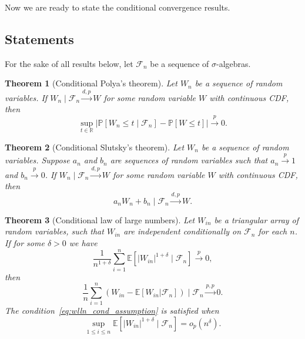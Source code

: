 \documentclass[aos]{imsart}
\theoremstyle{plain}
\newtheorem{theorem}{Theorem}
\theoremstyle{remark}
\newcommand{\E}{\mathbb E}								%
\renewcommand{\P}{\mathbb{P}}							%
\newcommand{\R}{\mathbb{R}}								%
\newcommand{\convp}{\overset p \rightarrow}             %
\newcommand{\convdp}{\overset {d,p} \longrightarrow}    %
\newcommand{\convpp}{\overset {p,p} \longrightarrow}    %
\begin{document}
\noindent Now we are ready to state the conditional convergence results. 

\subsection{Statements}

For the sake of all results below, let $\mathcal F_n$ be a sequence of $\sigma$-algebras.

\begin{theorem}[Conditional Polya's theorem]\label{thm:cond_polya} 
	Let $W_n$ be a sequence of random variables. If $W_n \mid \mathcal F_n \convdp W$ for some random variable $W$ with continuous CDF, then
	\begin{equation}
		\sup_{t \in \R}|\P[W_n \leq t \mid \mathcal F_n] - \P[W \leq t]| \convp 0.
	\end{equation}

\end{theorem}

\begin{theorem}[Conditional Slutsky's theorem]\label{thm:cond_slutsky}
	Let $W_n$ be a sequence of random variables. Suppose $a_n$ and $b_n$ are sequences of random variables such that $a_n \convp 1$ and $b_n \convp 0$. If $W_n \mid \mathcal F_n \convdp W$ for some random variable $W$ with continuous CDF, then
	\begin{equation}
		a_n W_n + b_n \mid \mathcal F_n \convdp W.
	\end{equation}
	
\end{theorem}

\begin{theorem}[Conditional law of large numbers]\label{thm:wlln_cond} 
	Let $W_{in}$ be a triangular array of random variables, such that $W_{in}$ are independent conditionally on $\mathcal F_n$ for each $n$. If for some $\delta > 0$ we have
	\begin{equation}
		\frac{1}{n^{1+\delta}}\sum_{i=1}^n\E[|W_{in}|^{1+\delta}\mid\mathcal{F}_n] \convp 0,
		\label{eq:wlln_cond_assumption}
	\end{equation}
	then 
	\begin{equation}
		\frac{1}{n} \sum_{i = 1}^n (W_{in} - \E[W_{in}|\mathcal{F}_n]) \mid \mathcal F_n \convpp 0.
		\label{eq:wlln_cond_conclusion}
	\end{equation}
	The condition~\eqref{eq:wlln_cond_assumption} is satisfied when
	\begin{equation}
		\sup_{1\leq i\leq n}\E[|W_{in}|^{1+\delta} \mid \mathcal{F}_n]=o_p(n^{\delta}).
		\label{eq:wlln_cond_sufficient}
	\end{equation}
\end{theorem}
\end{document}
